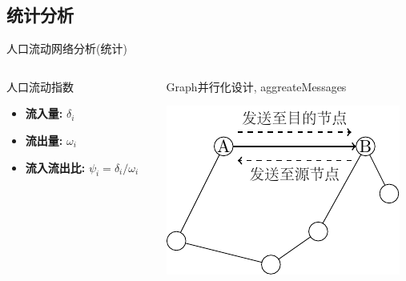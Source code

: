 \subsection{统计分析}

\begin{frame}[c]{人口流动网络分析(统计)}
    \begin{columns}
        \begin{column}{0.4 \textwidth}
            人口流动指数

            \begin{itemize}
                \item \textbf{流入量:} $\delta_i$
                \item \textbf{流出量:} $\omega_i$
                \item \textbf{流入流出比:} $\psi_i=\delta_i / \omega_i$
            \end{itemize}
        \end{column}

        \pause
        \begin{column}{0.6 \textwidth}
            Graph并行化设计, aggreateMessages

            \vspace{0.5em}
            \includegraphics[scale=0.8]{figures/triplet.pdf}
        \end{column}
    \end{columns}
\end{frame}

